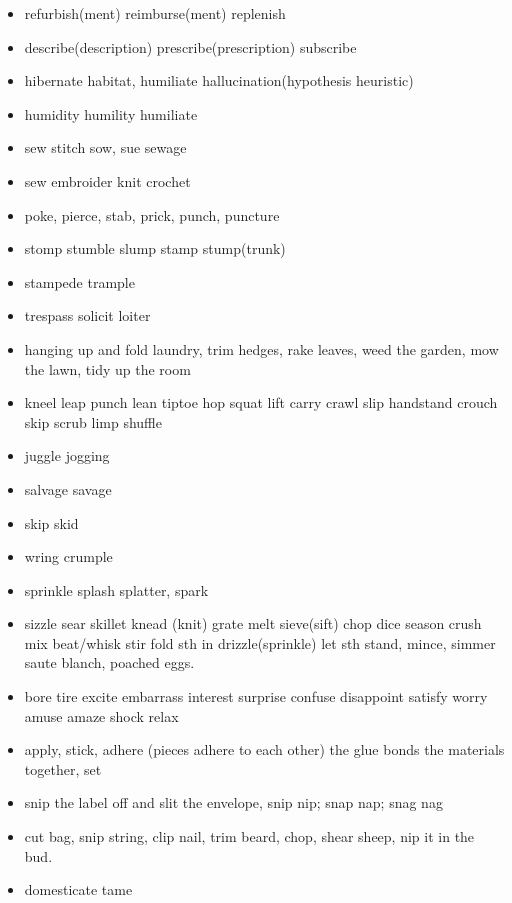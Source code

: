 \documentclass[a4paper,11pt,twoside]{book}
\begin{document}
\begin{itemize}
	\item refurbish(ment) reimburse(ment) replenish
	
	\item describe(description) prescribe(prescription) subscribe
	
	\item hibernate habitat, humiliate hallucination(hypothesis heuristic)
	
	\item humidity humility humiliate
	
	\item sew stitch sow,  sue sewage
	
	\item sew embroider knit crochet
	
	\item poke, pierce, stab, prick, punch, puncture
	
	\item stomp stumble slump stamp stump(trunk) 
	
	\item stampede trample 
	
	\item trespass solicit loiter
	
	\item hanging up and fold laundry, trim hedges, rake leaves, weed the garden, mow the lawn,  tidy up the room
	
	\item kneel leap punch lean tiptoe hop squat lift carry crawl slip handstand crouch skip scrub limp shuffle 
	
	\item juggle jogging
	
	\item salvage savage
	
	\item skip skid
	
	\item wring crumple
	
	\item sprinkle splash splatter, spark 
	
	\item sizzle sear skillet knead (knit) grate melt sieve(sift) chop dice season crush mix beat/whisk stir fold sth in drizzle(sprinkle) let sth stand, mince, simmer saute blanch, poached eggs.
	
	\item bore tire excite embarrass interest surprise confuse disappoint satisfy worry amuse amaze shock relax
	
	\item apply, stick, adhere (pieces adhere to each other) the glue bonds the materials together, set 
	
	\item snip the label off and slit the envelope, snip nip; snap nap; snag nag 
	
	\item cut bag, snip string, clip nail,  trim beard,  chop,  shear sheep, nip it in the bud. 
	
	\item domesticate tame 
\end{itemize}
\end{document}

